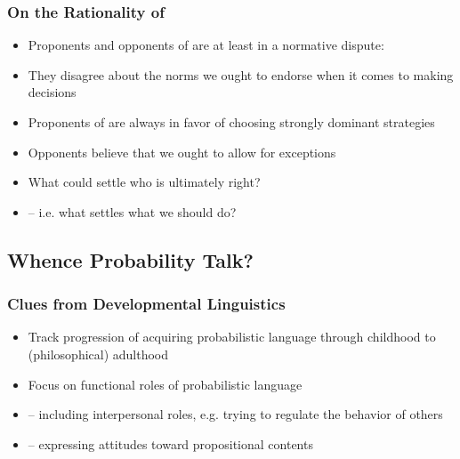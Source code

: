 

\begin{frame}
\frametitle{On the Rationality of }

\begin{itemize}[<+->]

\item Proponents and opponents of  are at least in a normative dispute:

\item[] They disagree about the norms we ought to endorse when it comes to making decisions

\item Proponents of  are always in favor of choosing strongly dominant strategies

\item Opponents believe that we ought to allow for exceptions 

\item What could settle who is ultimately right? 

\item[] -- i.e. what settles what we should do?


\end{itemize}
\end{frame}

\subsection{Whence Probability Talk?}

\begin{frame}
\frametitle{Clues from Developmental Linguistics}

\begin{itemize}[<+->]

\item Track progression of acquiring probabilistic language through childhood to (philosophical) adulthood

\item Focus on functional roles of probabilistic language

\item[] -- including interpersonal roles, e.g. trying to regulate the behavior of others

\item[] -- expressing attitudes toward propositional contents


\end{itemize}
\end{frame}

